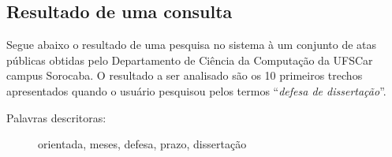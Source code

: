 
\newpage


\subsection*{Resultado de uma consulta}



Segue abaixo o resultado de uma pesquisa no sistema à um conjunto de atas públicas obtidas pelo Departamento de Ciência da Computação da UFSCar campus Sorocaba. O resultado a ser analisado são os 10 primeiros trechos apresentados quando o usuário pesquisou pelos termos ``\textit{defesa de dissertação}''.

\vspace{0.5 cm}






\begin{description}
\item[Palavras descritoras: ] orientada, meses, defesa, prazo, dissertação
\end{description}


